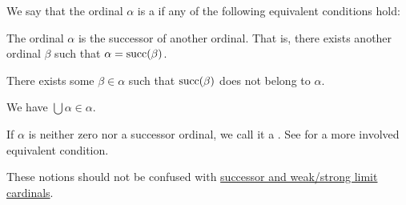 \begin{definition}\label{def:successor_and_limit_ordinal}
  We say that the ordinal \( \alpha \) is a  if any of the following equivalent conditions hold:

  \begin{thmenum}
     The ordinal \( \alpha \) is the successor of another ordinal. That is, there exists another ordinal \( \beta \) such that \( \alpha = \operatorname{succ}(\beta) \).

     There exists some \( \beta \in \alpha \) such that \( \operatorname{succ}(\beta) \) does not belong to \( \alpha \).

     We have \( \bigcup \alpha \in \alpha \).
  \end{thmenum}

  If \( \alpha \) is neither zero nor a successor ordinal, we call it a . See  for a more involved equivalent condition.

  These notions should not be confused with \hyperref[def:successor_and_limit_cardinal]{successor and weak/strong limit cardinals}.
\end{definition}
